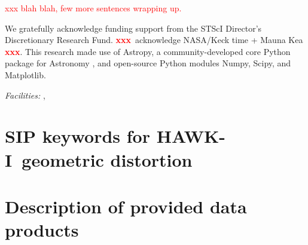 \documentclass[preprint2]{aastex6}
\newcommand\xxx{{\textcolor{red}{\bf xxx}}}
\newcommand\XXX[1]{{\textcolor{red}{xxx #1}}}
\gdef\HAWKI{\mbox{HAWK-I}}
\begin{document}
\XXX{blah blah, few more sentences wrapping up.}



% 





%
%
\vspace{-0.3cm} %
\acknowledgements

\noindent We gratefully acknowledge funding support from the STScI Director's Discretionary Research Fund.  \xxx\ acknowledge NASA/Keck time + Mauna Kea \xxx. This research made use of Astropy, a community-developed core Python package for Astronomy \citep{astropy}, and open-source Python modules Numpy, Scipy, and Matplotlib. 


{\it Facilities:} ,  %


%


\appendix

\section{SIP keywords for \HAWKI\ geometric distortion}

\section{Description of provided data products}
\end{document}
